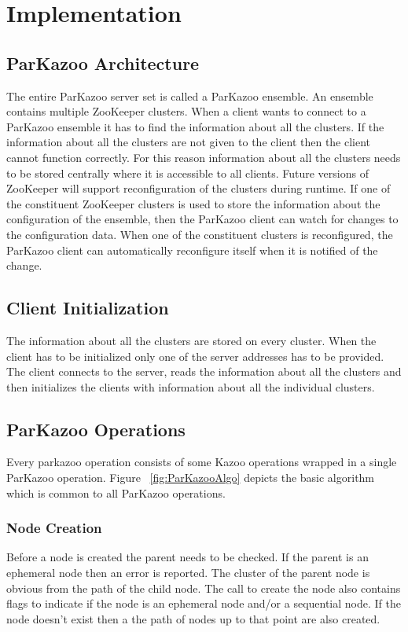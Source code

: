 \chapter{Implementation}

\section{ParKazoo Architecture}
  The entire ParKazoo server set is called a ParKazoo ensemble. An ensemble contains multiple ZooKeeper clusters. When a client wants to connect to a ParKazoo ensemble it has to find the information about all the clusters. If the information about all the clusters are not given to the client then the client cannot function correctly. For this reason information about all the clusters needs to be stored centrally where it is accessible to all clients. Future versions of ZooKeeper will support reconfiguration of the clusters during runtime. If one of the constituent ZooKeeper clusters is used to store the information about the configuration of the ensemble, then the ParKazoo client can watch for changes to the configuration data. When one of the constituent clusters is reconfigured, the ParKazoo client can automatically reconfigure itself when it is notified of the change. 

\addvspace{1em}

\addvspace{1em}
  
\section{Client Initialization}
    The information about all the clusters are stored on every cluster. When the client has to be initialized only one of the server addresses has to be provided. The client connects to the server, reads the information about all the clusters and then initializes the clients with information about all the individual clusters.

\section{ParKazoo Operations}
Every parkazoo operation consists of some Kazoo operations wrapped in a single ParKazoo operation. Figure ~\ref{fig:ParKazooAlgo} depicts the basic algorithm which is common to all ParKazoo operations.



\subsection{Node Creation}
Before a node is created the parent needs to be checked. If the parent is an ephemeral node then an error is reported. The cluster of the parent node is obvious from the path of the child node. The call to create the node also contains flags to indicate if the node is an ephemeral node and/or a sequential node. If the node doesn't exist then a the path of nodes up to that point are also created.

